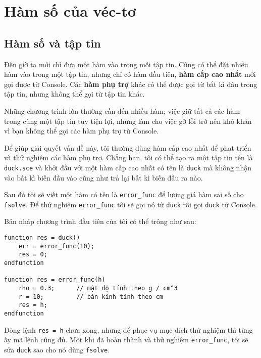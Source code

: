 \documentclass[12pt]{book}
\begin{document}










\chapter{Hàm số của véc-tơ}


\section{Hàm số và tập tin}
\label{funfiles}

Đến giờ ta mới chỉ đưa một hàm vào trong mỗi tập tin. Cũng có thể
đặt nhiều hàm vào trong một tập tin, nhưng chỉ có hàm đầu tiên,
{\bf hàm cấp cao nhất} mới gọi được từ Console. Các 
{\bf hàm phụ trợ} khác có thể được gọi từ bất kì đâu trong tập tin,
nhưng không thể gọi từ tập tin khác.

Những chương trình lớn thường cần đến nhiều hàm; việc giữ tất cả
các hàm trong cùng một tập tin tuy tiện lợi, nhưng làm cho việc gỡ lỗi
trở nên khó khăn vì bạn không thể gọi các hàm phụ trợ từ Console.

Để giúp giải quyết vấn đề này, tôi thường dùng hàm cấp cao nhất
để phat triển và thử nghiệm các hàm phụ trợ. Chẳng hạn, tôi có thể
tạo ra một tập tin tên là {\tt duck.sce} và khởi đầu với một hàm cấp 
cao nhất có tên là {\tt duck} mà không nhận vào bất kì biến đầu vào
cũng như trả lại bất kì biến đầu ra nào.

Sau đó tôi sẽ viết một hàm có tên là \verb#error_func# để lượng giá
hàm sai số cho {\tt fsolve}. Để thử nghiệm \verb#error_func# tôi sẽ
gọi nó từ  {\tt duck} rồi gọi {\tt duck} từ Console.

Bản nháp chương trình đầu tiên của tôi có thể trông như sau:

\begin{verbatim}
function res = duck()
    err = error_func(10);
    res = 0;
endfunction

function res = error_func(h)
    rho = 0.3;      // mật độ tính theo g / cm^3
    r = 10;         // bán kính tính theo cm
    res = h;
endfunction
\end{verbatim}
%
Dòng lệnh {\tt res = h} chưa xong, nhưng để phục vụ mục đích thử nghiệm
thì từng ấy mã lệnh cũng đủ.
Một khi đã hoàn thành và thử nghiệm \verb#error_func#, tôi sẽ sửa
{\tt duck} sao cho nó dùng {\tt fsolve}.
\end{document}
